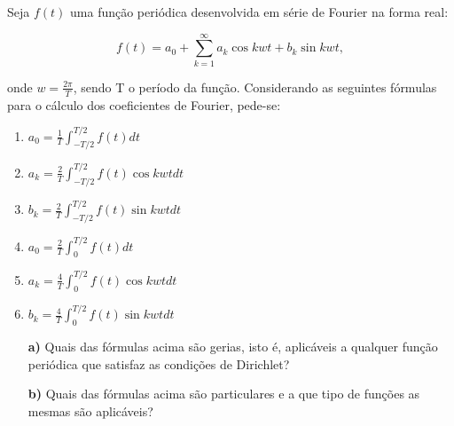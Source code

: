 \linespread{1.5}
Seja $f(t)$ uma função periódica desenvolvida em série de Fourier na forma real:

\begin{equation*}
    f(t) = a_0 + \sum_{k=1}^{\infty} a_k \cos{kwt} + b_k \sin{kwt},
\end{equation*}

onde $w = \frac{2\pi}{T}$, sendo T o período da função. Considerando as seguintes fórmulas para o cálculo dos coeficientes de Fourier, pede-se:
{\large\begin{enumerate}[I]
    \item \hspace{0.3cm}$a_0 = \frac{1}{T} \int_{-T/2}^{T/2} f(t) dt$
    \item \hspace{0.3cm}$a_k = \frac{2}{T} \int_{-T/2}^{T/2} f(t)\cos{kwt} dt$
    \item \hspace{0.3cm}$b_k = \frac{2}{T} \int_{-T/2}^{T/2} f(t)\sin{kwt} dt$
    \item \hspace{0.3cm}$a_0 = \frac{2}{T} \int_{0}^{T/2} f(t) dt$
    \item \hspace{0.3cm}$a_k = \frac{4}{T} \int_{0}^{T/2} f(t)\cos{kwt} dt$
    \item \hspace{0.3cm}$b_k = \frac{4}{T} \int_{0}^{T/2} f(t)\sin{kwt} dt$
\end{enumerate}}

\begin{itemize}
    \item[\textbf{a)}] Quais das fórmulas acima são gerias, isto é, aplicáveis a qualquer função periódica que satisfaz as condições de Dirichlet?
    \item[\textbf{b)}] Quais das fórmulas acima são particulares e a que tipo de funções as mesmas são aplicáveis?
\end{itemize}